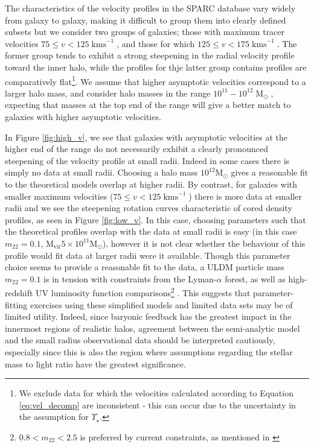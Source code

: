 \documentclass{pasa}%
\begin{document}
The characteristics of the velocity profiles in the SPARC database vary widely from galaxy to galaxy, making it difficult to group them into clearly defined subsets but we consider two groups of galaxies; those with maximum tracer velocities $75 \leq v < 125\operatorname{kms}^{-1}$, and those for which $125 \leq v < 175\operatorname{kms}^{-1}$. The former group tends to exhibit a strong steepening in the radial velocity profile toward the inner halo, while the  profiles for thje latter  group contains profiles  are comparatively flat\footnote{We exclude data for which the velocities calculated according to Equation \ref{eq:vel_decomp} are inconsistent - this can occur due to the uncertainty in the assumption for $\Upsilon_\star$.}. We assume that higher asymptotic velocities correspond to a larger halo mass, and consider halo masses in the range $10^{11} - 10^{12} \operatorname{M}_{\odot}$, expecting that masses at the top end of the range will give a better match to galaxies with higher asymptotic velocities. 


In Figure \ref{fig:high_v}, we see that galaxies with asymptotic velocities at the higher end of the range do not necessarily exhibit a clearly pronounced steepening of the velocity profile at small radii. Indeed in some cases there is simply no data at small radii. Choosing a halo mass $10^{12} \mathrm{M}_{\odot}$ gives a reasonable fit to the theoretical models overlap at higher radii. By contrast, for galaxies with smaller maximum velocities ($75 \leq v < 125\operatorname{kms}^{-1}$) there is more data at smaller radii and we see the steepening rotation curves characteristic of cored density profiles, as seen in Figure \ref{fig:low_v}. In this case, choosing parameters such that the theoretical profiles overlap with the data at small radii is easy (in this case $m_{22} = 0.1$, $\mathrm{M}_{\mathrm{vir}}5\times10^{11} \mathrm{M}_{\odot}$), however it is not clear whether the behaviour of this profile would fit data at larger radii were it available. Though this parameter choice seems to provide a reasonable fit to the data, a ULDM particle mass $m_{22} = 0.1$ is in tension with constraints from the Lyman-$\alpha$ forest, as well as high-redshift UV luminosity function comparisons\footnote{$ 0.8 < m_{22} < 2.5$ is preferred by current constraints, as mentioned in \cite{Robles:2018fur}} \cite{Amendola:2005ad, Bozek:2014uqa, Armengaud:2017nkf, Ni:2019qfa, Nebrin:2018vqt}. This suggests that parameter-fitting exercises using these simplified models and limited data sets may be of limited utility. Indeed, since baryonic feedback has the greatest impact in the innermost regions of realistic halos, agreement between the semi-analytic model and the small radius observational data should be interpreted cautiously, especially since this is also the region where assumptions regarding the stellar mass to light ratio have the greatest significance.  
\end{document}
